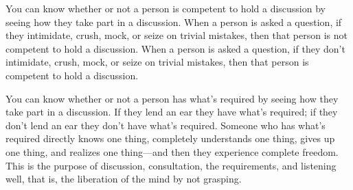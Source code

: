 \documentclass[12pt,openany]{book}%
\begin{document}
You can know whether or not a person is competent to hold a discussion by seeing how they take part in a discussion. When a person is asked a question, if they intimidate, crush, mock, or seize on trivial mistakes, then that person is not competent to hold a discussion. When a person is asked a question, if they don’t intimidate, crush, mock, or seize on trivial mistakes, then that person is competent to hold a discussion. 

You can know whether or not a person has what’s required by seeing how they take part in a discussion. If they lend an ear they have what’s required; if they don’t lend an ear they don’t have what’s required. Someone who has what’s required directly knows one thing, completely understands one thing, gives up one thing, and realizes one thing—and then they experience complete freedom. This is the purpose of discussion, consultation, the requirements, and listening well, that is, the liberation of the mind by not grasping. 
\end{document}
